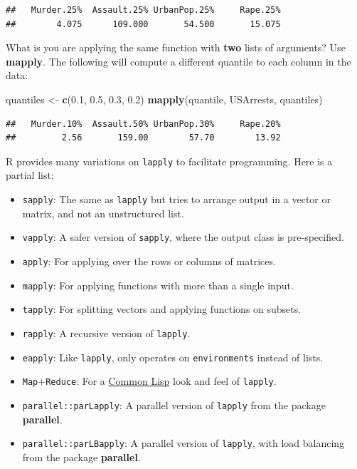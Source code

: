 \documentclass[]{book}
\newenvironment{Shaded}{\begin{snugshade}}{\end{snugshade}}
\newcommand{\KeywordTok}[1]{\textcolor[rgb]{0.13,0.29,0.53}{\textbf{#1}}}
\newcommand{\FloatTok}[1]{\textcolor[rgb]{0.00,0.00,0.81}{#1}}
\newcommand{\StringTok}[1]{\textcolor[rgb]{0.31,0.60,0.02}{#1}}
\newcommand{\NormalTok}[1]{#1}
\providecommand{\tightlist}{%
  \setlength{\itemsep}{0pt}\setlength{\parskip}{0pt}}
\theoremstyle{definition}
\theoremstyle{definition}
\theoremstyle{definition}
\theoremstyle{remark}
\begin{document}
\begin{verbatim}
##   Murder.25%  Assault.25% UrbanPop.25%     Rape.25% 
##        4.075      109.000       54.500       15.075
\end{verbatim}

What is you are applying the same function with \textbf{two} lists of
arguments? Use \textbf{mapply}. The following will compute a different
quantile to each column in the data:

\begin{Shaded}
\begin{Highlighting}[]
\NormalTok{quantiles <-}\StringTok{ }\KeywordTok{c}\NormalTok{(}\FloatTok{0.1}\NormalTok{, }\FloatTok{0.5}\NormalTok{, }\FloatTok{0.3}\NormalTok{, }\FloatTok{0.2}\NormalTok{)}
\KeywordTok{mapply}\NormalTok{(quantile, USArrests, quantiles)}
\end{Highlighting}
\end{Shaded}

\begin{verbatim}
##   Murder.10%  Assault.50% UrbanPop.30%     Rape.20% 
##         2.56       159.00        57.70        13.92
\end{verbatim}

R provides many variations on \texttt{lapply} to facilitate programming.
Here is a partial list:

\begin{itemize}
\tightlist
\item
  \texttt{sapply}: The same as \texttt{lapply} but tries to arrange
  output in a vector or matrix, and not an unstructured list.
\item
  \texttt{vapply}: A safer version of \texttt{sapply}, where the output
  class is pre-specified.
\item
  \texttt{apply}: For applying over the rows or columns of matrices.
\item
  \texttt{mapply}: For applying functions with more than a single input.
\item
  \texttt{tapply}: For splitting vectors and applying functions on
  subsets.
\item
  \texttt{rapply}: A recursive version of \texttt{lapply}.
\item
  \texttt{eapply}: Like \texttt{lapply}, only operates on
  \texttt{environments} instead of lists.
\item
  \texttt{Map}+\texttt{Reduce}: For a
  \href{https://en.wikipedia.org/wiki/Common_Lisp}{Common Lisp} look and
  feel of \texttt{lapply}.
\item
  \texttt{parallel::parLapply}: A parallel version of \texttt{lapply}
  from the package \textbf{parallel}.
\item
  \texttt{parallel::parLBapply}: A parallel version of \texttt{lapply},
  with load balancing from the package \textbf{parallel}.
\end{itemize}
\end{document}
